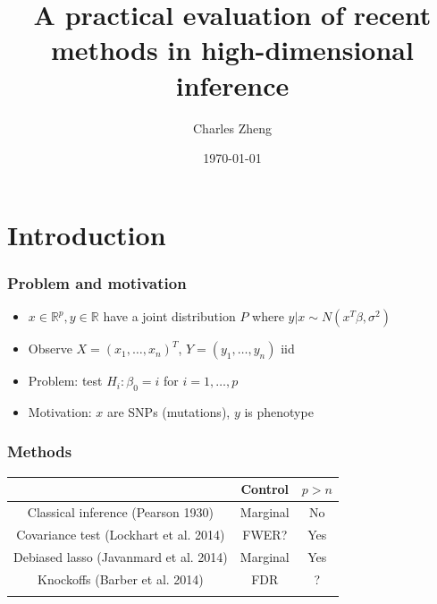 \documentclass{beamer}
\title{A practical evaluation of recent methods in high-dimensional inference}
\author{Charles Zheng} %
\institute[Stanford] %
{Stanford University}
\date{\today} %
\begin{document}
\begin{frame}
\titlepage %
\end{frame}

\section{Introduction}

\begin{frame}
\frametitle{Problem and motivation}
\begin{itemize}
\item $x \in \mathbb{R}^p, y \in \mathbb{R}$ have a joint distribution $P$ where $y|x \sim N(x^T \beta, \sigma^2)$
\item Observe $X = (x_1, \hdots, x_n)^T$, $Y = (y_1,\hdots, y_n)$ iid
\item Problem: test $H_i: \beta_0 = i$ for $i = 1,\hdots, p$
\item Motivation: $x$ are SNPs (mutations), $y$ is phenotype
\end{itemize}
\end{frame}

\begin{frame}
\frametitle{Methods}
\begin{center}
\begin{tabular}{|c|c|c|} \hline
 & Control & $p > n$\\ \hline
Classical inference (Pearson 1930) & Marginal & No \\ \hline
Covariance test (Lockhart et al. 2014) &  FWER? & Yes \\ \hline
Debiased lasso (Javanmard et al. 2014) & Marginal & Yes\\ \hline
Knockoffs (Barber et al. 2014) & FDR & ? \\ \hline
 & &  \\ \hline
\end{tabular}
\end{center}
\end{frame}
\end{document}

